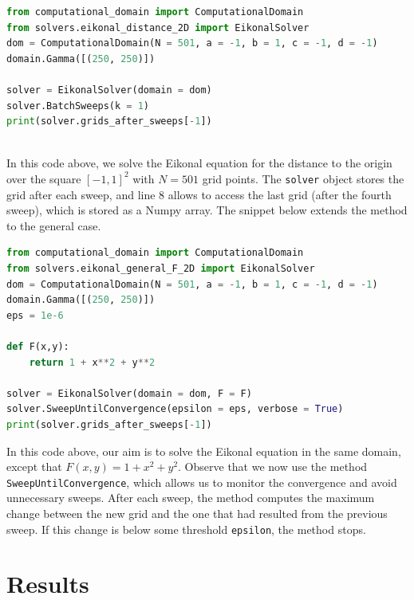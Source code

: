 \documentclass[11pt]{article}
\theoremstyle{definition}
\theoremstyle{remark}
\begin{document}
\begin{lstlisting}[language=Python, caption = Instance of an Eikonal Solver for the 2D distance function]
from computational_domain import ComputationalDomain
from solvers.eikonal_distance_2D import EikonalSolver
dom = ComputationalDomain(N = 501, a = -1, b = 1, c = -1, d = -1)
domain.Gamma([(250, 250)])

solver = EikonalSolver(domain = dom)
solver.BatchSweeps(k = 1)
print(solver.grids_after_sweeps[-1])
\end{lstlisting} \\

\noindent In this code above, we solve the Eikonal equation for the distance to the origin over the square $[-1,1]^2$ with $N=501$ grid points. The \texttt{solver} object stores the grid after each sweep, and line 8 allows to access the last grid (after the fourth sweep), which is stored as a Numpy array. The snippet below extends the method to the general case. \\

\begin{lstlisting}[language=Python, caption = Instance of an Eikonal Solver for a general velocity F]
from computational_domain import ComputationalDomain
from solvers.eikonal_general_F_2D import EikonalSolver
dom = ComputationalDomain(N = 501, a = -1, b = 1, c = -1, d = -1)
domain.Gamma([(250, 250)])
eps = 1e-6

def F(x,y):
    return 1 + x**2 + y**2

solver = EikonalSolver(domain = dom, F = F)
solver.SweepUntilConvergence(epsilon = eps, verbose = True)
print(solver.grids_after_sweeps[-1])
\end{lstlisting}

\noindent In this code above, our aim is to solve the Eikonal equation in the same domain, except that $F(x,y)=1+x^2+y^2$. Observe that we now use the method \texttt{SweepUntilConvergence}, which allows us to monitor the convergence and avoid unnecessary sweeps. After each sweep, the method computes the maximum change between the new grid and the one that had resulted from the previous sweep. If this change is below some threshold \texttt{epsilon}, the method stops. 

\section{Results}
\end{document}
